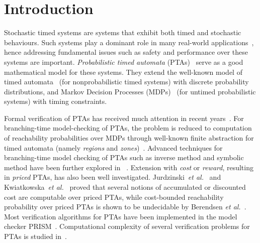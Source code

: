 \section{Introduction}
Stochastic timed systems are systems that exhibit both timed and stochastic behaviours.
Such systems play a dominant role in many real-world applications~\cite{DBLP:books/daglib/0020348}, hence
addressing fundamental issues such as safety and performance over these systems are important.
\emph{Probabilistic timed automata} (PTAs)~\cite{DBLP:journals/fmsd/NormanPS13,DBLP:journals/tcs/Beauquier03,DBLP:journals/tcs/KwiatkowskaNSS02} serve as a good mathematical model for these systems.
They extend the well-known model of timed automata~\cite{DBLP:journals/tcs/AlurD94} (for nonprobabilistic timed systems) with discrete probability distributions, and Markov Decision Processes (MDPs)~\cite{PutermanMDP} (for untimed probabilistic systems) with timing constraints.

Formal verification of PTAs has received much attention in recent years~\cite{DBLP:journals/fmsd/NormanPS13}.
For branching-time model-checking of PTAs, the problem is reduced to computation of reachability probabilities over MDPs through well-known finite abstraction for timed automata (namely \emph{regions} and \emph{zones})~\cite{JensenPTA,DBLP:journals/tcs/Beauquier03,DBLP:journals/tcs/KwiatkowskaNSS02}.
Advanced techniques for branching-time model checking of PTAs such as inverse method and symbolic method have been further explored in  ~\cite{DBLP:journals/fmsd/AndreFS13,DBLP:journals/iandc/KwiatkowskaNSW07,DBLP:conf/formats/KwiatkowskaNP09,DBLP:conf/formats/JovanovicKN15}.
Extension with \emph{cost} or \emph{reward}, resulting in \emph{priced} PTAs, has also been well investigated.
Jurdzinski~\emph{et al.}~\cite{DBLP:conf/concur/JurdzinskiKNT09} and Kwiatkowska~\emph{et al.}~\cite{DBLP:journals/fmsd/KwiatkowskaNPS06} proved that several notions of accumulated or discounted cost are computable over priced PTAs, while
cost-bounded reachability probability over priced PTAs is shown to be undecidable by Berendsen \emph{et al.}~\cite{DBLP:conf/tamc/BerendsenCJ09}.
Most verification algorithms for PTAs have been implemented in the model checker PRISM~\cite{DBLP:conf/cav/KwiatkowskaNP11}. Computational complexity of several verification problems for PTAs is studied in~\cite{DBLP:journals/ipl/LaroussinieS07,DBLP:journals/lmcs/JurdzinskiSL08,DBLP:conf/concur/JurdzinskiKNT09}.

